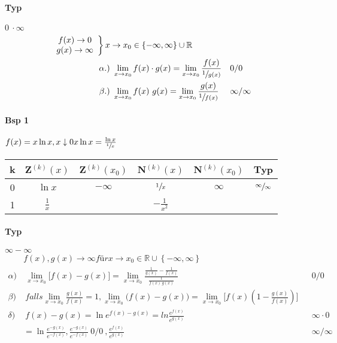\documentclass{article}
\begin{document}
\paragraph{Typ} $0 \ \cdot \infty $ \\
\begin{align*}
	\left. 
	\begin{array}{c} 
		f(x) \to 0
		\\
		g(x) \to \infty
	\end{array} 
	\right\} 
	x& \to x_0 \in \left\{  - \infty, \infty \right\} \cup \mathbb{R}
	\\
	\alpha.)& \ \lim_{x \to x_0} f(x) \cdot g(x) = \lim_{x \to x_0} 
	\frac{f(x)}{\sfrac{1}	{g(x)}} && \text{0/0} 
	\\
	\beta.)& \ \lim_{x \to x_0} f(x) \ g(x) = \lim_{x \to x_0} 
	\frac{g(x)}{\sfrac{1}{f(x)}}  && \text{$\infty / \infty$}
\end{align*}

\paragraph{Bsp 1} $f(x) = x \ln x , x \downarrow 0 \\ x \ln x = \frac{\ln x}{\sfrac{1}{x}}\\$
\begin{tabular}{ c c c c c | c } 
	k & Z$^{(k)}(x)$ & Z$^{(k)}(x_0)$ & N$^{(k)}(x)$ & N$^{(k)}(x_0)$ & Typ 
	\\
 	\hline 
 	0 & $\ln x$ & $ - \infty$ & $\sfrac{1}{x}$ & $\infty$ & $\sfrac{\infty}
 	{\infty}$ \\ 
	1 & $\frac{1}{x}$ & & $-\frac{1}{x^2}$ & & \\ 
\end{tabular}

\paragraph{Typ} $\infty - \infty$
\begin{align*}
	&f(x),g(x) \to \infty für x \to x_0 \in \mathbb{R} \cup \left\{ - \infty,\infty 
	\right\}
	\\
	\alpha)& \ \lim_{x \to x_0} \bigg[f(x) - g(x)\bigg] = \lim_{x \to x_0} 	
		\frac{\frac{1}{g(x)} - \frac{1}{f(x)}}{\frac{1}{f(x) \ g(x)}} && 	
		\text{0/0}
	\\	
	\beta)& \ falls \lim_{x \to x_0} \frac{g(x)}{f(x)} = 1, \lim_{x \to x_0}
		\big(f(x)-g(x)\big)=\lim_{x \to x_0}\bigg[f(x)(1-\frac{g(x)}{f(x)}) \bigg]
	\\
	\delta)& \ f(x) - g(x) = \ln e^{f(x)-g(x)} = ln\frac{e^{f(x)}}{e^{g(x)}} && 
	\text{$\infty \cdot 0 $}
	\\
	&=\ln \frac{e^{-g(x)}}{e^{-f(x)}} , \frac{e^{-g(x)}}{e^{-f(x)}} \ 0/0 \ , 
	\frac{e^{f(x)}}{e^{g(x)}} && \text{$\infty / \infty $}
\end{align*}
\end{document}
